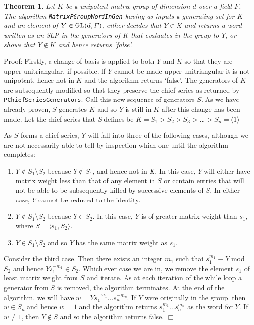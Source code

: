 \documentclass[12pt]{report}
\newtheorem{theorem}[definition]{Theorem}
\newenvironment{proof}{\normalsize {\sc Proof}:}{{\hfill $\Box$ \\}}
\def\GL{{\rm GL}}
\begin{document}
\begin{theorem}
Let $K$ be a unipotent matrix group of dimension $d$ over a field $F$. The algorithm {\tt MatrixPGroupWordInGen} having as inputs a generating set for $K$ and an element of $Y \in \GL(d, F)$, either decides that $Y \in K$ and returns a word written as an SLP in the generators of $K$ that evaluates in the group to $Y$, or shows that $Y \notin K$ and hence returns `false'.
\end{theorem}

\begin{proof}
Firstly, a change of basis is applied to both $Y$ and $K$ so that they are upper unitriangular, if possible. If $Y$ cannot be made upper unitriangular it is not unipotent, hence not in $K$ and the algorithm returns `false'. The generators of $K$ are subsequently modified so that they preserve the chief series as returned by {\tt PChiefSeriesGenerators}. Call this new sequence of generators $S$. As we have already proven, $S$ generates $K$ and so $Y$ is still in $K$ after this change has been made. Let the chief series that $S$ defines be $K = S_1 > S_2 > S_3 > \ldots > S_n = \langle 1 \rangle$

As $S$ forms a chief series, $Y$ will fall into three of the following cases, although we are not necessarily able to tell by inspection which one until the algorithm completes:

\begin{enumerate}
\item $Y \notin S_1 \setminus S_2$ because $Y \notin S_1$, and hence not in $K$. In this case, $Y$ will either have matrix weight less than that of any element in $S$ or contain entries that will not be able to be subsequently killed by successive elements of $S$. In either case, $Y$ cannot be reduced to the identity.
\item $Y \notin S_1 \setminus S_2$ because $Y \in S_2$. In this case, $Y$ is of greater matrix weight than $s_1$, where $S = \langle s_1, S_2 \rangle$.
\item $Y \in S_1 \setminus S_2$ and so $Y$ has the same matrix weight as $s_1$.
\end{enumerate}

Consider the third case. Then there exists an integer $m_1$ such that $s_1 ^ {m_1} \equiv Y$ mod $S_2$ and hence $Y s_1 ^ {-m_1} \in S_2$. Which ever case we are in, we remove the element $s_1$ of least matrix weight from $S$ and iterate. As at each iteration of the while loop a generator from $S$ is removed, the algorithm terminates. At the end of the algorithm, we will have $w = Y s_1 ^ {-m_1} \ldots s_n ^ {-m_n}$. If $Y$ were originally in the group, then $w \in S_n$ and hence $w = 1$ and the algorithm returns $s_1 ^ {m_1} \ldots s_n ^ {m_n}$ as the word for $Y$. If $w \ne 1$, then $Y \notin S$ and so the algorithm returns false.
\end{proof}
\end{document}

